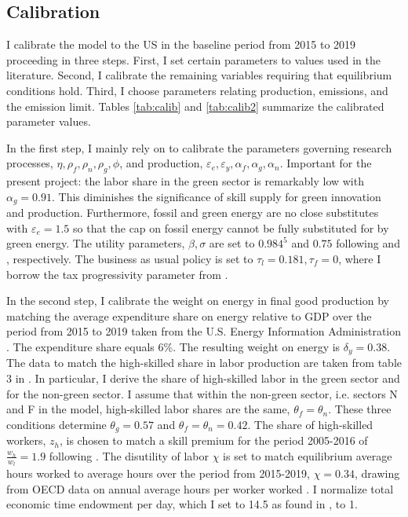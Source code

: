 \subsection{Calibration}\label{subsec:calib}
I calibrate the model to the US in the baseline period from 2015 to 2019 proceeding in three steps. First, I set certain parameters to values used in the literature. Second, I calibrate the remaining variables requiring that equilibrium conditions hold. Third, I choose parameters relating production, emissions, and the emission limit. Tables \ref{tab:calib} and \ref{tab:calib2} summarize the calibrated parameter values.

In the first step, I mainly rely on \cite{Fried2018ClimateAnalysis} to calibrate the parameters governing research processes, $\eta, \rho_f,\rho_n, \rho_g, \phi $, and production, $\varepsilon_e, \varepsilon_y, \alpha_f, \alpha_g, \alpha_n$.  Important for the present project: the labor share in the green sector is remarkably low with $\alpha_g=0.91$. This diminishes the significance of skill supply for green innovation and production. Furthermore, fossil and green energy are no close substitutes with $\varepsilon_e=1.5$ so that the cap on fossil energy cannot be fully substituted for by green energy. The utility parameters, $\beta, \sigma$ are set to $0.984^5$ and $0.75$ following \cite{Barrage2019OptimalPolicy} and \cite{Chetty2011AreMargins}, respectively. The business as usual policy is set to $\tau_l=0.181, \tau_f=0$, where I borrow the tax progressivity parameter from \cite{Heathcote2017OptimalFramework}. 

In the second step, I calibrate the weight on energy in final good production by matching the average expenditure share on energy relative to GDP over the period from 2015 to 2019 taken from the U.S. Energy Information Administration \citep[][Table 1.7]{EIAEnergy}. The expenditure share equals 6\%. The resulting weight on energy is $\delta_y=0.38$.%
 The data to match the high-skilled share in labor production are taken from table 3 in \cite{Consoli2016DoCapital}. In particular, I derive the share of high-skilled labor in the green sector and for the non-green sector. I assume that within the non-green sector, i.e. sectors N and F in the model, high-skilled labor shares are the same, $\theta_f=\theta_n$.  These three conditions determine $\theta_g=0.57$ and $\theta_f=\theta_n=0.42$. The share of high-skilled workers, $z_h$, is chosen to match a skill premium for the period 2005-2016 of $\frac{w_h}{w_l}=1.9$ following \cite{Slavik2020WagePremium}. The disutility of labor $\chi$ is set to match equilibrium average hours worked to average hours over the period from 2015-2019, $\chi=0.34$, drawing from OECD data on annual average hours per worker worked \citep{OECDHoursworked}. I normalize total economic time endowment per day, which I set to 14.5 as found in \cite{Jones1993OptimalGrowth}, to 1. 

